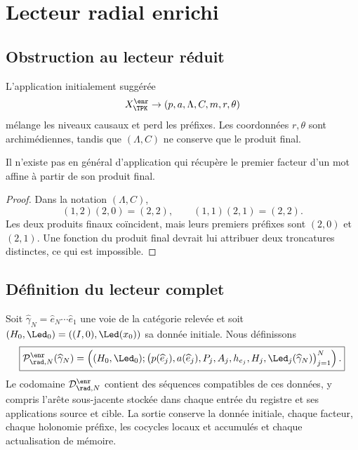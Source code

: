 \chapter{Lecteur radial enrichi}

\section{Obstruction au lecteur réduit}

L'application initialement suggérée
\[
 X_{\TPK}^{\enr}\to(p,a,\Lambda,C,m,r,\theta)
\]
mélange les niveaux causaux et perd les préfixes. Les coordonnées \(r,\theta\) sont archimédiennes, tandis que \((\Lambda,C)\) ne conserve que le produit final.

\begin{proposition}
Il n'existe pas en général d'application qui récupère le premier facteur d'un mot affine à partir de son produit final.
\end{proposition}
\begin{proof}
Dans la notation \((\Lambda,C)\),
\[
 (1,2)(2,0)=(2,2),
 \qquad
 (1,1)(2,1)=(2,2).
\]
Les deux produits finaux coïncident, mais leurs premiers préfixes sont \((2,0)\) et \((2,1)\). Une fonction du produit final devrait lui attribuer deux troncatures distinctes, ce qui est impossible.
\end{proof}

\section{Définition du lecteur complet}

Soit \(\widehat\gamma_N=\widehat e_N\cdots\widehat e_1\) une voie de la catégorie relevée et soit \((H_0,\Led_0)=((I,0),\Led(x_0))\) sa donnée initiale. Nous définissons
\begin{equation}
 \boxed{
 \mathcal P_{\rad,N}^{\enr}(\widehat\gamma_N)
 =\left(
 (H_0,\Led_0);
 \bigl(p(\widehat e_j),a(\widehat e_j),P_j,A_j,
 h_{e_j},H_j,\Led_j(\widehat\gamma_N)\bigr)_{j=1}^{N}
 \right).}
 \label{espiral:eq:lector-radial-enriquecido}
\end{equation}
Le codomaine \(\mathcal D_{\rad,N}^{\enr}\) contient des séquences compatibles de ces données, y compris l'arête sous-jacente stockée dans chaque entrée du registre et ses applications source et cible. La sortie conserve la donnée initiale, chaque facteur, chaque holonomie préfixe, les cocycles locaux et accumulés et chaque actualisation de mémoire.

